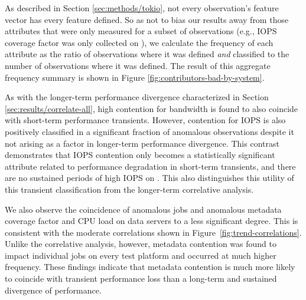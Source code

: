 As described in Section \ref{sec:methods/tokio}, not every observation's feature vector has every feature defined.
So as not to bias our results away from those attributes that were only measured for a subset of observations (e.g., IOPS coverage factor was only collected on \mira), we calculate the frequency of each attribute as the ratio of observations where it was defined \emph{and} classified to the number of observations where it was defined.
The result of this aggregate frequency summary is shown in Figure \ref{fig:contributors-bad-by-system}.

As with the longer-term performance divergence characterized in Section \ref{sec:results/correlate-all}, high contention for bandwidth is found to also coincide with short-term performance transients.
However, contention for IOPS is also positively classified in a significant fraction of anomalous observations despite it not arising as a factor in longer-term performance divergence.
This contrast demonstrates that IOPS contention only becomes a statistically significant attribute related to performance degradation in short-term transients, and there are no sustained periods of high IOPS on \mirafsone.
This also distinguishes this utility of this transient classification from
the longer-term correlative analysis.

We also observe the coincidence of anomalous jobs and anomalous metadata coverage factor and CPU load on
data servers to a less significant degree.  This is
consistent with the moderate correlations shown in
Figure~\ref{fig:trend-correlations}.
Unlike the correlative analysis, however, metadata contention was found to impact individual jobs on every test platform and occurred at much higher frequency.
These findings indicate that metadata contention is much more likely to coincide with transient performance loss than a long-term and sustained divergence of performance.

